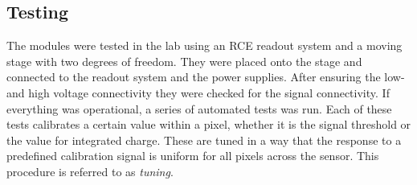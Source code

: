 \documentclass[12pt]{packages/mytustyle}  %
\begin{document}
\subsection{Testing}
The modules were tested in the lab using an RCE readout system and a moving stage with two degrees of freedom. They were placed onto the stage and connected to the readout system and the power supplies. After ensuring the low- and high voltage connectivity they were checked for the signal connectivity. If everything was operational, a series of automated tests was run. Each of these tests calibrates a certain value within a pixel, whether it is the signal threshold or the value for integrated charge. These are tuned in a way that the response to a predefined calibration signal is uniform for all pixels across the sensor. This procedure is referred to as \emph{tuning}. 
\end{document}
